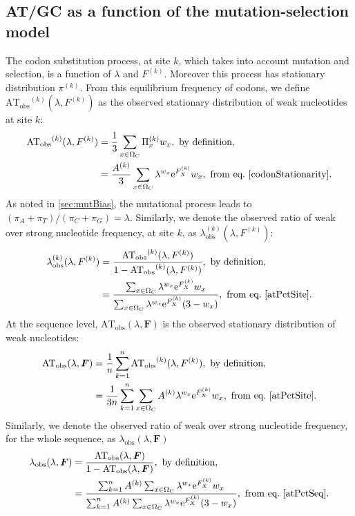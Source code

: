 \subsection{AT/GC as a function of the mutation-selection model}
The \gls{codon} \gls{substitution} process, at site $k$, which takes into account mutation and selection, is a function of $\lambda$ and $F^{(k)}$.
Moreover this process has stationary distribution $\pi^{(k)}$.
From this equilibrium frequency of \glspl{codon}, we define $\mathrm{AT_{obs}}^{(k)}(\lambda, F^{(k)})$ as the observed stationary distribution of weak nucleotides at site $k$:
\begin{align}
\mathrm{AT_{obs}}^{(k)}(\lambda, F^{(k)})
& =\frac{1}{3} \sum_{x \in \Omega_{\mathrm{C}}} \Pi_x^{(k)} w_x , \ \textrm{by definition},\\
& =\frac{A^{(k)}}{3} \sum_{x \in \Omega_{\mathrm{C}}} \lambda^{w_x} \mathrm{e}^{F_X^{(k)}} w_x , \ \textrm{from eq.} \ \ref{codonStationarity}.
\label{atPctSite}
\end{align}
As noted in \ref{sec:mutBias}, the mutational process leads to $(\pi_A+\pi_T)/(\pi_C+\pi_G) = \lambda$.
Similarly, we denote the observed ratio of weak over strong nucleotide frequency, at site $k$, as $\lambda_{\mathrm{obs}}^{(k)} (\lambda, F^{(k)})$:
\begin{align}
\lambda_{\mathrm{obs}}^{(k)} (\lambda, F^{(k)})
& =\dfrac{\mathrm{AT_{obs}}^{(k)}(\lambda, F^{(k)})}{1 - \mathrm{AT_{obs}}^{(k)}(\lambda, F^{(k)}) }, \ \textrm{by definition},\\
& =\dfrac{ \sum_{x \in \SetCodon} \lambda^{w_x} \e^{F_X^{(k)}} w_x}{\sum_{x \in \SetCodon} \lambda^{w_x} \e^{F_X^{(k)}} (3 - w_x )}, \ \textrm{from eq.} \ \ref{atPctSite}.
\end{align}
At the sequence level, $\mathrm{AT_{obs}}(\lambda, \bm{F})$ is the observed stationary distribution of weak nucleotides:
\begin{align}
\mathrm{AT_{obs}}(\lambda, \bm{F})
& =\frac{1}{n}\sum_{k=1}^{n} \mathrm{AT_{obs}}^{(k)}(\lambda, F^{(k)}), \ \textrm{by definition}, \\
& =\frac{1}{3n}\sum_{k=1}^{n} \sum_{x \in \SetCodon} A^{(k)} \lambda^{w_x} \e^{F_X^{(k)}} w_x , \ \textrm{from eq.} \ \ref{atPctSite}.
\label{atPctSeq}
\end{align}
Similarly, we denote the observed ratio of weak over strong nucleotide frequency, for the whole sequence, as $\lambda_{\mathrm{obs}} (\lambda, \bm{F})$
\begin{align}
\lambda_{\mathrm{obs}} (\lambda, \bm{F})
& = \frac{\mathrm{AT_{obs}}(\lambda, \bm{F})}{ 1 - \mathrm{AT_{obs}}(\lambda, \bm{F}) }, \ \textrm{by definition},\\
& =\dfrac{ \sum_{k=1}^{n}  A^{(k)} \sum_{x \in \Omega_{\mathrm{C}}} \lambda^{w_x} \mathrm{e}^{F_X^{(k)}} w_x}{ \sum_{k=1}^{n} A^{(k)} \sum_{x \in \Omega_{\mathrm{C}}} \lambda^{w_x} \mathrm{e}^{F_X^{(k)}} (3 - w_x )}, \ \textrm{from eq.} \ \ref{atPctSeq}.
\end{align}
